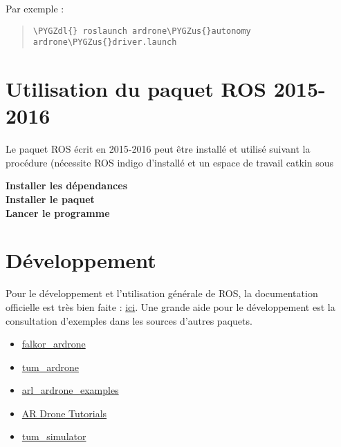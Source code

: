 \documentclass[letterpaper,10pt,french]{sphinxmanual}
\def\PYGZus{\char`\_}
\def\PYGZdl{\char`\$}
\begin{document}
Par exemple :
\begin{quote}

\begin{Verbatim}[commandchars=\\\{\}]
\PYGZdl{} roslaunch ardrone\PYGZus{}autonomy ardrone\PYGZus{}driver.launch
\end{Verbatim}
\end{quote}


\section{Utilisation du paquet ROS 2015-2016}
\label{ros:utilisation-du-paquet-ros-2015-2016}
Le paquet ROS écrit en 2015-2016 peut être installé et utilisé suivant la procédure (nécessite ROS indigo d'installé et
un espace de travail catkin sous 
\begin{description}
\item[{\textbf{Installer les dépendances}}] \leavevmode
\item[{\textbf{Installer le paquet}}] \leavevmode
\item[{\textbf{Lancer le programme}}] \leavevmode
\end{description}


\section{Développement}
\label{ros:developpement}
Pour le développement et l'utilisation générale de ROS, la documentation officielle est très bien faite : \href{http://wiki.ros.org/fr/ROS/Tutorials}{ici}.
Une grande aide pour le développement est la consultation d'exemples dans les sources d'autres paquets.
\begin{itemize}
\item {} 
\href{https://github.com/FalkorSystems/falkor\_ardrone}{falkor\_ardrone}

\item {} 
\href{http://www.ros.org/wiki/tum\_ardrone}{tum\_ardrone}

\item {} 
\href{https://github.com/parcon/arl\_ardrone\_examples}{arl\_ardrone\_examples}

\item {} 
\href{https://github.com/mikehamer/ardrone\_tutorials}{AR Drone Tutorials}

\item {} 
\href{http://wiki.ros.org/tum\_simulator}{tum\_simulator}

\end{itemize}
\end{document}
